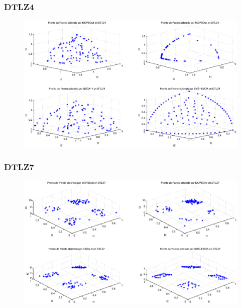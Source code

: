 \documentclass[10pt,compress]{beamer}
\begin{document}
\begin{frame}
	\frametitle{DTLZ4}
	\begin{figure}
      \begin{center}
	  \includegraphics[scale=0.3]{rdtlz4r.eps}
      \end{center}
   \end{figure}
\end{frame}
\begin{frame}
	\frametitle{DTLZ7}
	\begin{figure}
      \begin{center}
	  \includegraphics[scale=0.3]{rdtlz7r.eps}
      \end{center}
	    \end{figure}
\end{frame}
\end{document}

